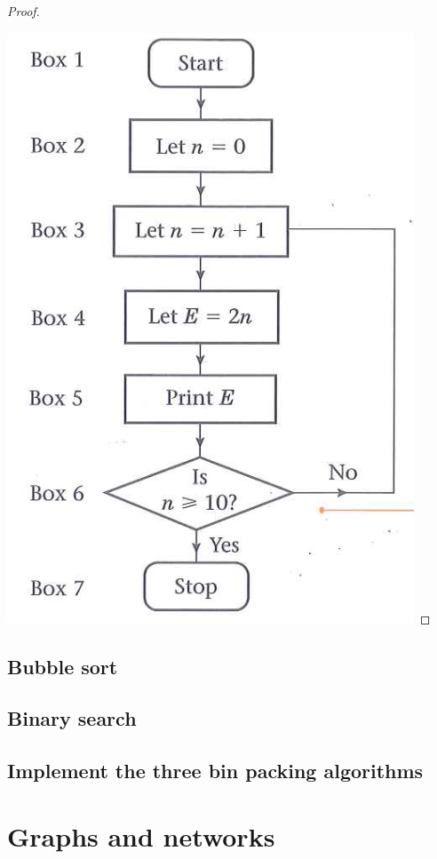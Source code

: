 \documentclass[a4paper]{article}
\begin{document}
\begin{eg}
\begin{proof}
\begin{enumerate}
		\end{enumerate}
		\includegraphics[scale=0.4]{img_D/1.png}
	\end{proof}

\end{eg}

\subsection{Bubble sort}
\subsection{Binary search}
\subsection{Implement the three bin packing algorithms}

\section{Graphs and networks}
\end{document}

